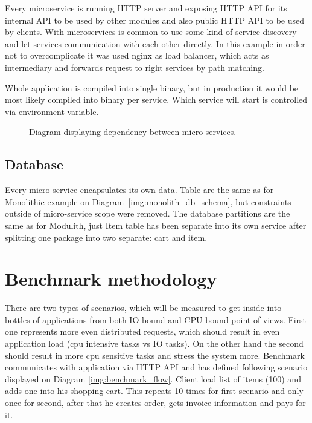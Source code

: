 Every microservice is running HTTP server and exposing HTTP API for its internal API to be used by other modules and also public HTTP API to be used by clients. With microservices is common to use some kind of service discovery and let services communication with each other directly. In this example in order not to overcomplicate it was used nginx as load balancer, which acts as intermediary and forwards request to right services by path matching.

Whole application is compiled into single binary, but in production it would be most likely compiled into binary per service. Which service will start is controlled via environment variable.

\begin{figure}
    \centering
    
    \caption{Diagram displaying dependency between micro-services. \label{img:microservices_dependency}}
\end{figure}

\subsection{Database}
Every micro-service encapsulates its own data. Table are the same as for Monolithic example on Diagram~\ref{img:monolith_db_schema}, but constraints outside of micro-service scope were removed. The database partitions are the same as for Modulith, just Item table has been separate into its own service after splitting one package into two separate: cart and item.



\section{Benchmark methodology}
There are two types of scenarios, which will be measured to get inside into bottles of applications from both IO bound and CPU bound point of views. First one represents more even distributed requests, which should result in even application load (cpu intensive tasks vs IO tasks).
On the other hand the second should result in more cpu sensitive tasks and stress the system more.
Benchmark communicates with application via HTTP API and has defined following scenario displayed on Diagram \ref{img:benchmark_flow}.
Client load list of items (100) and adds one into his shopping cart. This repeats 10 times for first scenario and only once for second, after that he creates order, gets invoice information and pays for it.

